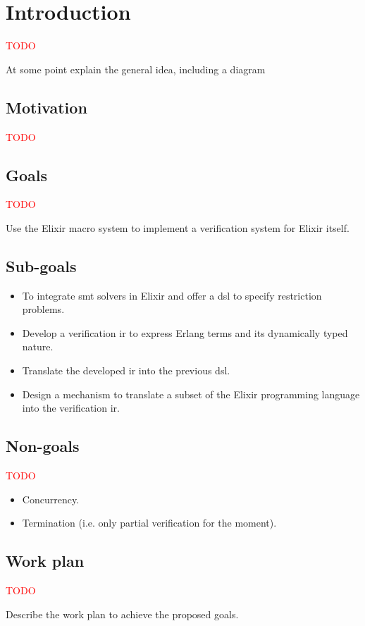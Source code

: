 \chapter{Introduction}
\label{cap:introduction}

\textcolor{red}{TODO}

At some point explain the general idea, including a diagram

\section{Motivation}

\textcolor{red}{TODO}

\section{Goals}

\textcolor{red}{TODO}

Use the Elixir macro system to implement a verification system for Elixir itself.

\section{Sub-goals}

\begin{itemize}
  \item To integrate \acrshort{smt} solvers in Elixir and offer a \gls{dsl} 
    to specify restriction problems.
  \item Develop a verification \gls{ir} to express Erlang terms and its 
    dynamically typed nature.
  \item Translate the developed \gls{ir} into the previous \gls{dsl}.
  \item Design a mechanism to translate a subset of the Elixir 
    programming language into the verification \gls{ir}.
\end{itemize}

\section{Non-goals}

\textcolor{red}{TODO}

\begin{itemize}
  \item Concurrency.
  \item Termination (i.e. only partial verification for the moment).
\end{itemize}

\section{Work plan}

\textcolor{red}{TODO}

Describe the work plan to achieve the proposed goals.
